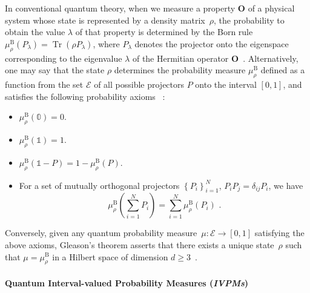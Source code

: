 \documentclass[english,reprint, aps, prl,superscriptaddress, showpacs,
showkeys, longbibliography]{revtex4-1}
\theoremstyle{plain}
\theoremstyle{definition}
\newcommand{\events}{\ensuremath{\mathcal{E}}}
\newcommand{\Tr}{\mathop{\mathrm{Tr}}\nolimits}
\begin{document}
In conventional quantum theory, when we measure a property $\mathbf{O}$
of a physical system whose state is represented by a density matrix~$\rho$,
the probability to obtain the value $\lambda$ of that property is determined by the
Born rule $\mu_{\rho}^{\mathrm{B}}\left(P_{\lambda}\right)=\Tr\left(\rho P_{\lambda}\right)$,
where $P_{\lambda}$ denotes the projector onto the eigenspace corresponding
to the eigenvalue $\lambda$ of the Hermitian operator
$\mathbf{O}$~\cite{Born1983,peres1995quantum,544199,Jaeger2007}. 
Alternatively, one may say that the state $\rho$ determines the 
probability measure $\mu_{\rho}^{\mathrm{B}}$ defined as a
function from the set $\events$ of all possible projectors $P$ onto the interval 
$[0,1]$, and satisfies the following probability axioms~
\cite{10.2307/2308516,gleason1957,Redhead1987-REDINA,Maassen2010}: 
\begin{itemize}
\item $\mu_{\rho}^{\mathrm{B}}(\mathbb{0})=0$. 
\item $\mu_{\rho}^{\mathrm{B}}(\mathbb{1})=1$. 
\item $\mu_{\rho}^{\mathrm{B}}\left(\mathbb{1}-P\right)=
1-\mu_{\rho}^{\mathrm{B}}\left(P\right)$. 
\item For a set of mutually orthogonal projectors $\left\{ P_{i}\right\} _{i=1}^{N}$,
$P_iP_j=\delta_{ij}P_i$,
we have 
\begin{equation}
\mu_{\rho}^{\mathrm{B}}\left(\sum_{i=1}^{N}P_{i}\right)=
\sum_{i=1}^{N}\mu_{\rho}^{\mathrm{B}}\left(P_{i}\right)
\textrm{ .}\label{eq:QuantumProbability-Addition}
\end{equation}
\end{itemize}
Conversely, given any quantum probability measure~$\mu:\events\rightarrow[0,1]$
satisfying the above axioms, Gleason's theorem asserts that there
exists a unique state~$\rho$ such that $\mu=\mu_{\rho}^{\mathrm{B}}$
in a Hilbert space of dimension $d\geq3$~\cite{gleason1957,Redhead1987-REDINA,peres1995quantum}.

\paragraph{Quantum Interval-valued Probability Measures (\emph{IVPMs})}
\end{document}
